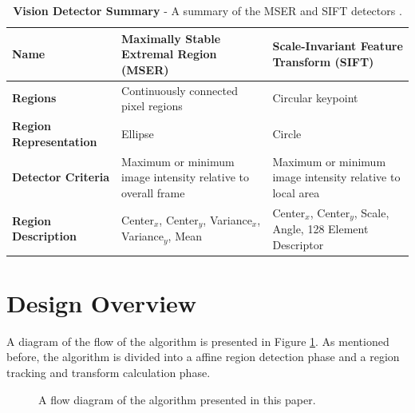 \documentclass[oneside,11pt]{Latex/Classes/PhDthesisPSnPDF}
\begin{document}
\begin{table}[h]
\centering
\begin{tabular}{| p{2cm} | p{5.75cm} | p{5.75cm} |} 
\hline
{\bf Name} & Maximally Stable Extremal Region (MSER) & Scale-Invariant Feature Transform (SIFT) \\ \hline
{\bf Regions} & Continuously connected pixel regions & Circular keypoint \\ \hline
{\bf Region Representation} & Ellipse & Circle \\ \hline
{\bf Detector Criteria} & Maximum or minimum image intensity relative to overall frame  & Maximum or minimum image intensity relative to local area \\ \hline
{\bf Region Description} & Center$_x$, Center$_y$, Variance$_x$, Variance$_y$, Mean & Center$_x$, Center$_y$, Scale, Angle, 128 Element Descriptor \\ \hline
\end{tabular}
\caption[Vision Detector Summary]{\textbf{Vision Detector Summary} - A summary of the MSER and SIFT detectors \cite{marano_09}.}
\label{table_mser_and_sift}
\end{table}

\section{Design Overview}

A diagram of the flow of the algorithm is presented in Figure \ref{fig_mar_algorithm_flow}.  As mentioned before, the algorithm is divided into a affine region detection phase and a region tracking and transform calculation phase.  

\begin{figure}[h!]
  \caption{\label{fig_mar_algorithm_flow} A flow diagram of the algorithm presented in this paper.}
\end{figure}
\end{document}
